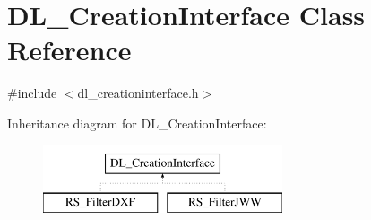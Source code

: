\hypertarget{classDL__CreationInterface}{\section{D\-L\-\_\-\-Creation\-Interface Class Reference}
\label{classDL__CreationInterface}
}


{\ttfamily \#include $<$dl\-\_\-creationinterface.\-h$>$}

Inheritance diagram for D\-L\-\_\-\-Creation\-Interface\-:\begin{figure}[H]
\begin{center}
\leavevmode
\includegraphics[height=2.000000cm]{classDL__CreationInterface}
\end{center}
\end{figure}
